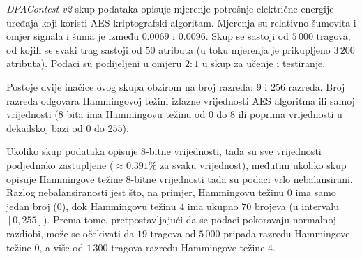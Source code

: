 \documentclass[times, utf8, numeric, diplomski]{fer}
\begin{document}
\textit{DPAContest v2} skup podataka opisuje mjerenje potrošnje električne energije uređaja koji koristi AES kriptografski algoritam. Mjerenja su relativno šumovita i omjer signala i šuma je između $0.0069$ i $0.0096$. Skup se sastoji od $5\,000$ tragova, od kojih se svaki trag sastoji od $50$ atributa (u toku mjerenja je prikupljeno $3\,200$ atributa). Podaci su podijeljeni u omjeru $2:1$ u skup za učenje i testiranje. 

Postoje dvije inačice ovog skupa obzirom na broj razreda: $9$ i $256$ razreda. Broj razreda odgovara Hammingovoj težini izlazne vrijednosti AES algoritma ili samoj vrijednosti ($8$ bita ima Hammingovu težinu od $0$ do $8$ ili poprima vrijednosti u dekadskoj bazi od $0$ do $255$).

Ukoliko skup podataka opisuje $8$-bitne vrijednosti, tada su sve vrijednosti podjednako zastupljene ($\approx 0.391\%$ za svaku vrijednost), međutim ukoliko skup opisuje Hammingove težine $8$-bitne vrijednosti tada su podaci vrlo nebalansirani. Razlog nebalansiranosti jest što, na primjer, Hammingovu težinu $0$ ima samo jedan broj ($0$), dok Hammingovu težinu $4$ ima ukupno $70$ brojeva (u intervalu $[0,255]$). Prema tome, pretpostavljajući da se podaci pokoravaju normalnoj razdiobi, može se očekivati da $19$ tragova od $5\,000$ pripada razredu Hammingove težine $0$, a više od $1\,300$ tragova razredu Hammingove težine $4$.
\end{document}
